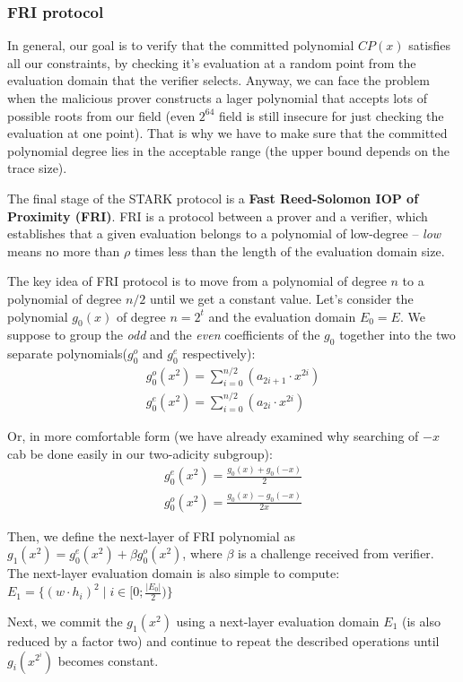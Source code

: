 \documentclass[../lecture-notes.tex]{subfiles}
\begin{document}
\subsubsection{FRI protocol}
In general, our goal is to verify that the committed polynomial $CP(x)$ satisfies all our constraints, by checking it's evaluation at a random point from the evaluation domain that the verifier selects. Anyway, we can face the problem when the malicious prover constructs a lager polynomial that accepts lots of possible roots from our field (even $2^{64}$ field is still insecure for just checking the evaluation at one point). That is why we have to make sure that the committed polynomial degree lies in the acceptable range (the upper bound depends on the trace size).

The final stage of the STARK protocol is a \textbf{Fast Reed-Solomon IOP of Proximity (FRI)}. FRI is a protocol between a prover and a verifier, which establishes that a given evaluation belongs to a polynomial of low-degree -- \textit{low} means no more than $\rho$ times less than the length of the evaluation domain size.

The key idea of FRI protocol is to move from a polynomial of degree $n$ to a polynomial of degree $n/2$ until we get a constant value. Let's consider the polynomial $g_0(x)$ of degree $n=2^t$ and the evaluation domain $E_0 = E$. We suppose to group the \textit{odd} and the \textit{even} coefficients of the $g_0$ together into the two separate polynomials($g_0^o$ and $g_0^e$ respectively):
\begin{gather*}
    g_0^o(x^2) = \sum_{i=0}^{n/2} (a_{2i+1}\cdot x^{2i})\\
    g_0^e(x^2) = \sum_{i=0}^{n/2} (a_{2i}\cdot x^{2i})
\end{gather*}

Or, in more comfortable form (we have already examined why searching of $-x$ cab be done easily in our two-adicity subgroup):
\begin{gather*}
    g_0^e(x^2) = \frac{g_0(x) + g_0(-x)}{2}\\
    g_0^o(x^2) = \frac{g_0(x) - g_0(-x)}{2x}
\end{gather*}

Then, we define the next-layer of FRI polynomial as $g_1(x^2) = g_0^e(x^2) + \beta g_0^o(x^2)$, where $\beta$ is a challenge received from verifier. The next-layer evaluation domain is also simple to compute: $E_1 = \{(w\cdot h_i)^2 \;|\; i \in [0;\frac{|E_0|}{2})\}$

Next, we commit the $g_1(x^2)$ using a next-layer evaluation domain $E_1$ (is also reduced by a factor two) and continue to repeat the described operations until $g_i(x^{2^i})$ becomes constant.
\end{document}
